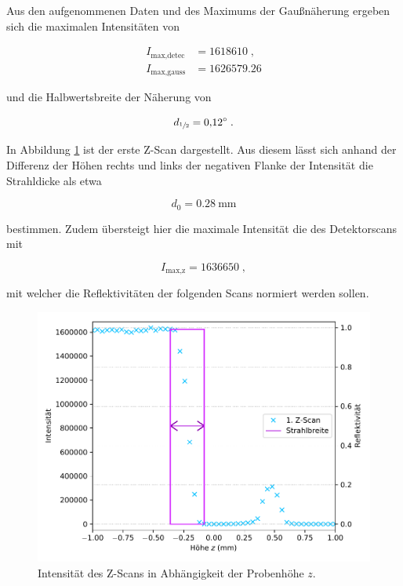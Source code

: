 Aus den aufgenommenen Daten und des Maximums der Gaußnäherung ergeben sich die maximalen
Intensitäten von 
\vspace{-25pt}

\vspace{-5pt}
\begin{align*}
    I_\text{max,detec} &= \num{1618610} \; ,\\
    I_\text{max,gauss} &= \num{1626579.26}
\end{align*}

und die Halbwertsbreite der Näherung von

\vspace{-5pt}
\begin{equation*}
    d_{\sfrac{1}{2}} = \SI{0.12}{\degree} \; .
\end{equation*}

In Abbildung \ref{fig:plot21} ist der erste Z-Scan dargestellt.
Aus diesem lässt sich anhand der Differenz der Höhen rechts und links der negativen Flanke der Intensität
die Strahldicke als etwa

\vspace{-5pt}
\begin{equation*}
    d_0 = \SI{0.28}{\milli\meter}
\end{equation*}

bestimmen. Zudem übersteigt hier die maximale Intensität die des Detektorscans mit 

\vspace{-5pt}
\begin{equation}
    I_\text{max,z} = \num{1636650} \; ,
    \label{eqn:imax}
\end{equation}

mit welcher die Reflektivitäten der folgenden Scans normiert werden sollen.

\begin{figure}
    \centering
    \includegraphics[scale=0.7]{content/plot21.pdf}
    \vspace{-10pt}
    \caption{Intensität des Z-Scans in Abhängigkeit der Probenhöhe $z$.}
    \label{fig:plot21}
\end{figure}


